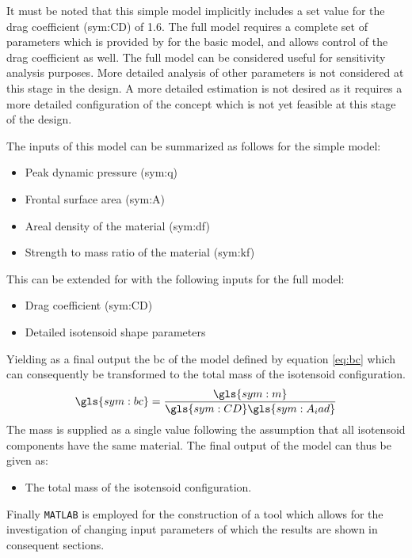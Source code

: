  It must be noted that this simple model implicitly includes a set value for the drag coefficient (\gls{sym:CD}) of 1.6. The full model requires a complete set of parameters which is provided by \cite{Anderson1969} for the basic model, and allows control of the drag coefficient as well. The full model can be considered useful for sensitivity analysis purposes. More detailed analysis of other parameters is not considered at this stage in the design. A more detailed estimation is not desired as it requires a more detailed configuration of the concept which is not yet feasible at this stage of the design.

The inputs of this model can be summarized as follows for the simple model:
\begin{itemize}
\item Peak dynamic pressure (\gls{sym:q})
\item Frontal surface area (\gls{sym:A})
\item Areal density of the material (\gls{sym:df})
\item Strength to mass ratio of the material (\gls{sym:kf})
\end{itemize}
This can be extended for with the following inputs for the full model:

\begin{itemize}
\item Drag coefficient (\gls{sym:CD})
\item Detailed isotensoid shape parameters
\end{itemize}

Yielding as a final output the \acrfull{bc} of the model defined by equation \ref{eq:bc} which can consequently be transformed to the total mass of the isotensoid configuration. 
\begin{equation}
\gls{sym:bc} = \frac{\gls{sym:m}}{\gls{sym:CD} \gls{sym:A_iad}}
\label{eq:bc}
\end{equation}
The mass is supplied as a single value following the assumption that all isotensoid components have the same material. The final output of the model can thus be given as:
\begin{itemize}
\item The total mass of the isotensoid configuration.
\end{itemize}
Finally \texttt{MATLAB} is employed for the construction of a tool which allows for the investigation of changing input parameters of which the results are shown in consequent sections.


